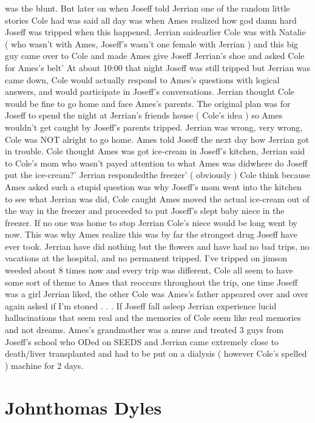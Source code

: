 \documentclass[12pt]{book}
\begin{document}
was the blunt. But later on when Joseff told Jerrian one of the random little stories Cole had was said all day was when Ames realized how god damn hard Joseff was tripped when this happened. Jerrian saidearlier Cole was with Natalie ( who wasn't with Ames, Joseff's wasn't one female with Jerrian ) and this big guy came over to Cole and made Ames give Joseff Jerrian's shoe and asked Cole for Ames's belt' At about 10:00 that night Joseff was still tripped but Jerrian was came down, Cole would actually respond to Ames's questions with logical answers, and would participate in Joseff's conversations. Jerrian thought Cole would be fine to go home and face Ames's parents. The original plan was for Joseff to spend the night at Jerrian's friends house ( Cole's idea ) so Ames wouldn't get caught by Joseff's parents tripped. Jerrian was wrong, very wrong, Cole was NOT alright to go home. Ames told Joseff the next day how Jerrian got in trouble. Cole thought Ames was got ice-cream in Joseff's kitchen, Jerrian said to Cole's mom who wasn't payed attention to what Ames was didwhere do Joseff put the ice-cream?' Jerrian respondedthe freezer' ( obviously ) Cole think because Ames asked such a stupid question was why Joseff's mom went into the kitchen to see what Jerrian was did, Cole caught Ames moved the actual ice-cream out of the way in the freezer and proceeded to put Joseff's slept baby niece in the freezer. If no one was home to stop Jerrian Cole's niece would be long went by now. This was why Ames realize this was by far the strongest drug Joseff have ever took. Jerrian have did nothing but the flowers and have had no bad trips, no vacations at the hospital, and no permanent tripped. I've tripped on jimson weeded about 8 times now and every trip was different, Cole all seem to have some sort of theme to Ames that reoccurs throughout the trip, one time Joseff was a girl Jerrian liked, the other Cole was Ames's father appeared over and over again asked if I'm stoned . . .  If Joseff fall asleep Jerrian experience lucid hallucinations that seem real and the memories of Cole seem like real memories and not dreams. Ames's grandmother was a nurse and treated 3 guys from Joseff's school who ODed on SEEDS and Jerrian came extremely close to death/liver transplanted and had to be put on a dialysis ( however Cole's spelled ) machine for 2 days.



\chapter{Johnthomas Dyles}
\end{document}
